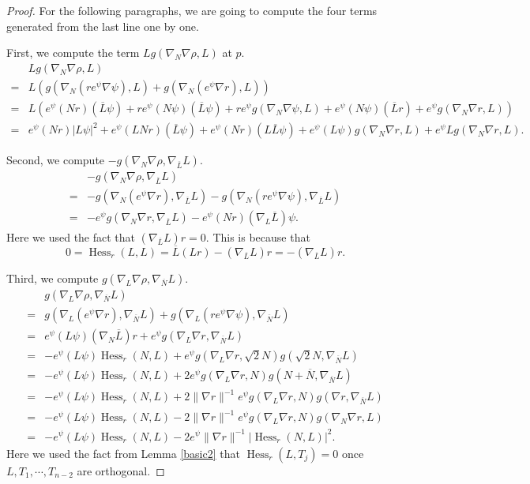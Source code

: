 \documentclass[11pt]{article}
\theoremstyle{plain} \numberwithin{equation}{section}
\theoremstyle{definition}
\DeclareMathOperator{\Hessian}{Hess}
\begin{document}
\begin{proof}
		For the following paragraphs, we are going to compute the four terms generated from the last line one by one.
		
		First, we compute the term $Lg(\nabla_N\nabla\rho, L)$ at $p$.
		\[\begin{split}
	&Lg(\nabla_N\nabla\rho, L)\\=&L\left(g(\nabla_N(r e^\psi\nabla\psi), L)+g(\nabla_N(e^\psi\nabla r), L)\right)\\=&L\left(e^\psi(N r)(\overline{L}\psi)+r e^\psi(N\psi)(\overline{L}\psi)+r e^\psi g(\nabla_N\nabla\psi, L)+e^\psi (N\psi)(\overline{L}r)+e^\psi g(\nabla_N\nabla r, L)\right)\\=&e^\psi (N r)|L\psi|^2+e^\psi(LN r)(\overline{L}\psi)+e^\psi(N r)(L\overline{L}\psi)+e^\psi(L\psi)g(\nabla_N\nabla r, L)+e^\psi Lg(\nabla_N\nabla r, L).
	\end{split}\]
	
	Second, we compute $-g(\nabla_N\nabla\rho, \nabla_{\overline{L}}L)$.
	\[\begin{split}
	&-g(\nabla_N\nabla\rho, \nabla_{\overline{L}}L)\\=&-g(\nabla_N(e^\psi\nabla r), \nabla_{\overline{L}}L)-g(\nabla_N(r e^\psi\nabla\psi),\nabla_{\overline{L}} L)\\=&-e^\psi g(\nabla_N\nabla r, \nabla_{\overline{L}}L)-e^\psi(Nr)(\nabla_L {\overline{L}})\psi.
	\end{split}\] Here we used the fact that $(\nabla_{\overline{L}}L)r=0$. This is because that \[0=\Hessian_r(L, L)=\overline{L}(Lr)-(\nabla_{\overline{L}}L)r=-(\nabla_{\overline{L}}L)r.\]
		
		Third, we compute $g(\nabla_L\nabla\rho, \nabla_{\overline{N}} L)$.
		\[\begin{split}
		&g(\nabla_L\nabla\rho, \nabla_{\overline{N}} L)\\=&g(\nabla_L(e^\psi\nabla r), \nabla_{\overline{N}} L)+g(\nabla_L(r e^\psi\nabla\psi), \nabla_{\overline{N}} L)\\=&e^\psi(L\psi)(\nabla_N\overline{L})r+e^\psi g(\nabla_L\nabla r, \nabla_{\overline{N}}L)\\=&-e^\psi(L\psi)\Hessian_r(N, L)+e^\psi g(\nabla_L\nabla r, \sqrt{2}N)g(\sqrt{2}N, \nabla_{\overline{N}}L)\\=&-e^\psi(L\psi)\Hessian_r(N, L)+2e^\psi g(\nabla_L\nabla r, N)g(N+\overline{N}, \nabla_{\overline{N}}L)\\=&-e^\psi(L\psi)\Hessian_r(N, L)+2\|\nabla r\|^{-1}e^\psi g(\nabla_L\nabla r, N)g(\nabla r, \nabla_{\overline{N}}L)\\=&-e^\psi(L\psi)\Hessian_r(N, L)-2\|\nabla r\|^{-1}e^\psi g(\nabla_L\nabla r, N)g(\nabla_N\nabla r, L)\\=&-e^\psi(L\psi)\Hessian_r(N, L)-2e^\psi \|\nabla r\|^{-1}|\Hessian_r(N, L)|^2.
		\end{split}\] Here we used the fact from Lemma \ref{basic2} that $\Hessian_r(L, T_j)=0$ once $L, T_1, \cdots, T_{n-2}$ are orthogonal.
		

\end{proof}
\end{document}
